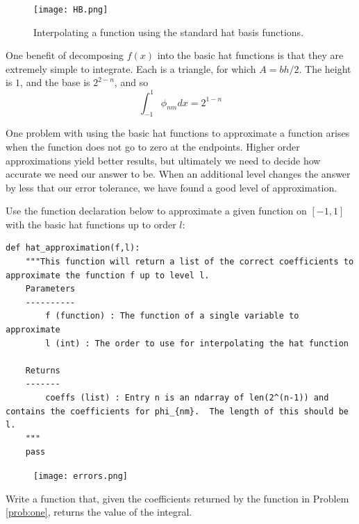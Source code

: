 \begin{center}
\begin{figure}
\texttt{[image: HB.png]}
\caption{Interpolating a function using the standard hat basis functions.}
\label{fig:HB}
\end{figure}
\end{center}

One benefit of decomposing $f(x)$ into the basic hat functions is that they are extremely simple to integrate.  Each is a triangle, for which $A=bh/2$.  The height is $1$, and the base is $2^{2-n}$, and so
\begin{equation*}
\int_{-1}^1 \phi_{nm} dx= 2^{1-n}
\end{equation*}

One problem with using the basic hat functions to approximate a function arises when the function does not go to zero at the endpoints.  Higher order approximations yield better results, but ultimately we need to decide how accurate we need our answer to be.  When an additional level changes the answer by less that our error tolerance, we have found a good level of approximation.

 \begin{problem}
Use the function declaration below to approximate a given function on $[-1,1]$ with the basic hat functions up to order $l$:
\begin{lstlisting}
def hat_approximation(f,l):
    """This function will return a list of the correct coefficients to approximate the function f up to level l.
    Parameters
    ----------
        f (function) : The function of a single variable to approximate
        l (int) : The order to use for interpolating the hat function

    Returns
    -------
        coeffs (list) : Entry n is an ndarray of len(2^(n-1)) and contains the coefficients for phi_{nm}.  The length of this should be l.
    """
    pass
\end{lstlisting}
\label{prob:one}
\end{problem}


\begin{center}
\begin{figure}
\texttt{[image: errors.png]}
\caption{}
\label{fig:errors}
\end{figure}
\end{center}

\begin{problem}
Write a function that, given the coefficients returned by the function in Problem \ref{prob:one}, returns the value of the integral.
\end{problem}

